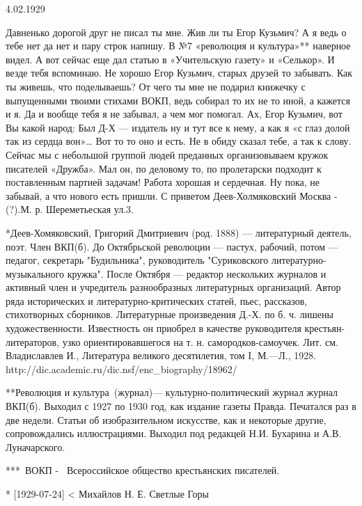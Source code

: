 4.02.1929

Давненько дорогой друг не писал ты мне.
Жив ли ты Егор Кузьмич? А я ведь о тебе нет да нет и пару строк напишу. В №7 «революция и культура»** наверное видел. А вот сейчас еще дал статью в «Учительскую газету» и «Селькор». И везде тебя вспоминаю. Не хорошо Егор Кузьмич, старых друзей то забывать. Как ты живешь, что поделываешь? От чего ты мне не подарил книжечку с выпущенными твоими стихами ВОКП, ведь собирал то их не то иной, а кажется и я. Да и вообще тебя я не забывал, а чем мог помогал. Ах, Егор Кузьмич, вот Вы какой народ: Был Д-Х — издатель ну и тут все к нему, а как я «с глаз долой так из сердца вон»… Вот то то оно и есть. Не в обиду сказал тебе, а так к слову. Сейчас мы с небольшой группой людей преданных организовываем кружок писателей «Дружба». Мал он, по деловому то, по пролетарски подходит к поставленным партией задачам!
Работа хорошая и сердечная. Ну пока, не забывай, а что нового есть пришли.
С приветом Деев-Холмяковский
Москва - (?).М. р. Шереметьеская ул.3.




*Деев-Хомяковский, Григорий Дмитриевич 
(род. 1888) — литературный деятель, поэт. Член ВКП(б). До Октябрьской революции — пастух, рабочий, потом — педагог, секретарь "Будильника", руководитель "Суриковского литературно-музыкального кружка". После Октября — редактор нескольких журналов и активный член и учредитель разнообразных литературных организаций. Автор ряда исторических и литературно-критических статей, пьес, рассказов, стихотворных сборников. Литературные произведения Д.-Х. по б. ч. лишены художественности. Известность он приобрел в качестве руководителя крестьян-литераторов, узко ориентировавшегося на т. н. самородков-самоучек.
Лит. см. Владиславлев И., Литература великого десятилетия, том I, М.—Л., 1928. 
http://dic.academic.ru/dic.nsf/enc_biography/18962/%


**Революция и культура (журнал)— культурно-политический журнал журнал ВКП(б). Выходил с 1927 по 1930 год, как издание газеты Правда. Печатался раз в две недели. Статьи об изобразительном искусстве, как и некоторые другие, сопровождались иллюстрациями. Выходил под редакцей Н.И. Бухарина и А.В. Луначарского.

*** ВОКП -  Всероссийское общество крестьянских писателей. 



* [1929-07-24] < Михайлов Н. Е.
Светлые Горы

